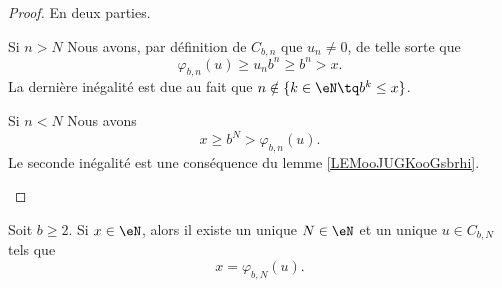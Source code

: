 \begin{proof}
    En deux parties.
    \begin{subproof}
    \item[Si \( n>N\)]
        Nous avons, par définition de \( C_{b,n}\) que \( u_n\neq 0\), de telle sorte que
        \begin{equation}
                \varphi_{b,n}(u)\geq u_nb^n\geq b^n>x .
        \end{equation}
        La dernière inégalité est due au fait que \( n\notin \{ k\in \eN\tq b^k\leq x \}\).
    \item[Si \( n<N\)]
        Nous avons 
        \begin{equation}
            x\geq b^N> \varphi_{b,n}(u).
        \end{equation}
        Le seconde inégalité est une conséquence du lemme \ref{LEMooJUGKooGsbrhi}.
    \end{subproof}
\end{proof}

\begin{theorem}
    Soit \( b\geq 2\). Si \( x\in \eN\), alors il existe un unique \( N\in \eN\) et un unique \( u\in C_{b,N} \) tels que
    \begin{equation}
        x=\varphi_{b,N}(u).
    \end{equation}
\end{theorem}

